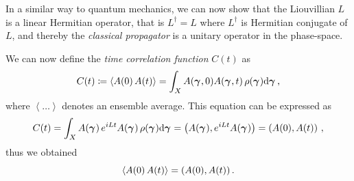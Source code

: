 \documentclass[10pt,a4paper]{book}
\theoremstyle{definition}
\begin{document}
\begin{appendices}
In a similar way to quantum mechanics, we can now show that the Liouvillian $L$ is a linear Hermitian operator, that is $L^{\dagger}=L$ where $L^{\dagger}$ is Hermitian conjugate of $L$, and thereby the \emph{classical propagator} is a unitary operator in the phase-space.

We can now define the \emph{time correlation function} $C(t)$ as
\begin{equation}
 C(t) \coloneqq \left\langle A(0)\,A(t)\right\rangle=\int_X A(\boldsymbol\gamma_{},0)A(\boldsymbol\gamma_{},t)\, \rho(\boldsymbol\gamma_{})\mbox{d}\boldsymbol\gamma_{}\,,
\end{equation}
where $\left\langle\ldots\right\rangle$ denotes an ensemble average. This equation can be expressed as 
\begin{equation*}
C(t) = \int_X A(\boldsymbol\gamma_{})\,e^{iLt}A(\boldsymbol\gamma_{})\, \rho	(\boldsymbol\gamma_{})\mbox{d}\boldsymbol\gamma_{} = \left(A(\boldsymbol\gamma_{}), e^{iLt}A(\boldsymbol\gamma_{}) \right) = \left( A(0),A(t)\right)\,,
\end{equation*}
thus we obtained
\begin{equation*}
 \left\langle A(0)\,A(t)\right\rangle = \left( A(0),A(t)\right).
\end{equation*}


\end{appendices}
\end{document}
